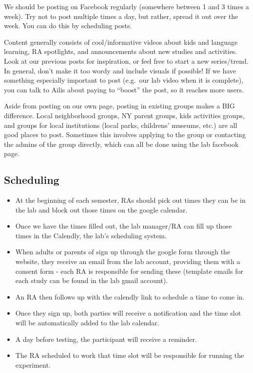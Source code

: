 \documentclass[
]{book}
\begin{document}
We should be posting on Facebook regularly (somewhere between 1 and 3 times a week). Try not to post multiple times a day, but rather, spread it out over the week. You can do this by scheduling posts.

Content generally consists of cool/informative videos about kids and language learning, RA spotlights, and announcements about new studies and activities. Look at our previous posts for inspiration, or feel free to start a new series/trend. In general, don't make it too wordy and include visuals if possible! If we have something especially important to post (e.g.~our lab video when it is complete), you can talk to Ailis about paying to ``boost'' the post, so it reaches more users.

Aside from posting on our own page, posting in existing groups makes a BIG difference. Local neighborhood groups, NY parent groups, kids activities groups, and groups for local institutions (local parks, childrens' museums, etc.) are all good places to post. Sometimes this involves applying to the group or contacting the admins of the group directly, which can all be done using the lab facebook page.

\hypertarget{scheduling}{%
\subsection*{Scheduling}\label{scheduling}}

\begin{itemize}
\item
  At the beginning of each semester, RAs should pick out times they can be in the lab and block out those times on the google calendar.
\item
  Once we have the times filled out, the lab manager/RA can fill up those times in the Calendly, the lab's scheduling system.
\item
  When adults or parents of sign up through the google form through the website, they receive an email from the lab account, providing them with a consent form - each RA is responsible for sending these (template emails for each study can be found in the lab gmail account).
\item
  An RA then follows up with the calendly link to schedule a time to come in.
\item
  Once they sign up, both parties will receive a notification and the time slot will be automatically added to the lab calendar.
\item
  A day before testing, the participant will receive a reminder.
\item
  The RA scheduled to work that time slot will be responsible for running the experiment.
\end{itemize}
\end{document}
